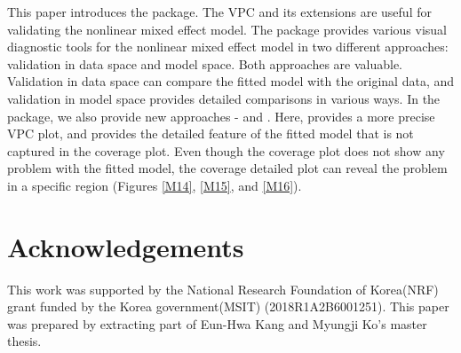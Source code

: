 This paper introduces the  package. The VPC and its extensions are useful for validating the nonlinear mixed effect model. The  package provides various visual diagnostic tools for the nonlinear mixed effect model in two different approaches: validation in data space and model space. Both approaches are valuable. Validation in data space can compare the fitted model with the original data, and validation in model space provides detailed comparisons in various ways. In the  package, we also provide new approaches -  and . Here,  provides a more precise VPC plot, and  provides the detailed feature of the fitted model that is not captured in the coverage plot. Even though the coverage plot does not show any problem with the fitted model, the coverage detailed plot can reveal the problem in a specific region (Figures \ref{M14}, \ref{M15}, and \ref{M16}).

\hypertarget{Acknowledgements}{%
\section{Acknowledgements}\label{Acknowledgements}}

This work was supported by the National Research Foundation of Korea(NRF) grant funded by the Korea government(MSIT) (2018R1A2B6001251). This paper was prepared by extracting part of Eun-Hwa Kang and Myungji Ko's master thesis.



\address{Eun-Hwa Kang\\
  Department of Statistics\\
   Ewha Womans University\\
  Seoul, Korea\\}

\address{Myungji Ko\\
  Department of Statistics\\
   Ewha Womans University\\
  Seoul, Korea\\}

\address{Eun-Kyung Lee\\
  Department of Statistics\\
   Ewha Womans University\\
  Seoul, Korea\\
  (0000-0003-0817-5000)\\
  }
